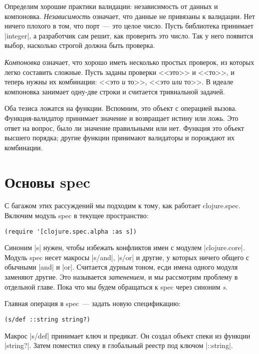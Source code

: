 Определим хорошие практики валидации: независимость от данных и
компоновка. \emph{Независимость} означает, что данные не привязаны к
валидации. Нет ничего плохого в том, что порт~--- это целое число. Пусть
библиотека принимает \spverb|integer|, а разработчик сам решит, как проверить
это число. Так у него появится выбор, насколько строгой должна быть проверка.

\emph{Компоновка} означает, что хорошо иметь несколько простых проверок, из
которых легко составить сложные. Пусть заданы проверки <<это>> и <<то>>,
и теперь нужны их комбинации: <<это \emph{и} то>>, <<это \emph{или} то>>.
В идеале компоновка занимает одну-две строки и считается тривиальной задачей.

Оба тезиса ложатся на функции. Вспомним, это объект с операцией
вызова. Функция-валидатор принимает значение и возвращает истину или ложь. Это
ответ на вопрос, было ли значение правильными или нет. Функция это объект
высшего порядка; другие функции принимают валидаторы и порождают их комбинации.

\section{Основы spec}

С багажом этих рассуждений мы подходим к тому, как работает
clojure.spec. Включим модуль spec в текущее пространство:

\begin{verbatim}
(require '[clojure.spec.alpha :as s])
\end{verbatim}

Синоним \spverb|s| нужен, чтобы избежать конфликтов имен с модулем
\spverb|clojure.core|. Модуль spec несет макросы \spverb|s/and|, \spverb|s/or|
и другие, у которых ничего общего с обычными \spverb|and| и \spverb|or|. Считается
дурным тоном, есди имена одного модуля заменяют другие. Это называется \emph{затенением},
и мы рассмотрим проблему в отдельной главе. Пока что мы будем обращаться к spec
через синоним \emph{s}.

Главная операция в spec~--- задать новую спецификацию:

\begin{verbatim}
(s/def ::string string?)
\end{verbatim}

Макрос \spverb|s/def| принимает ключ и предикат. Он создал объект спеки из функции
\spverb|string?|. Затем поместил спеку в глобальный реестр под ключом \spverb|::string|.

